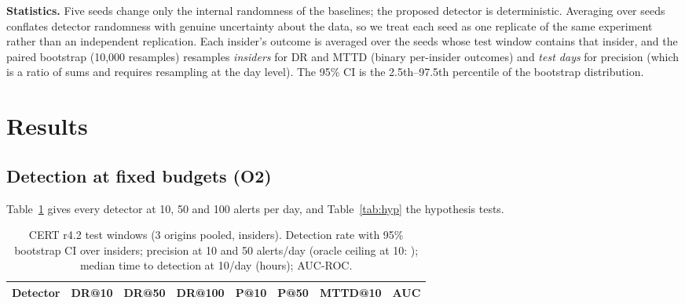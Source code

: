 \documentclass[conference]{IEEEtran}
\begin{document}
\textbf{Statistics.} Five seeds change only the internal randomness of the baselines; the proposed
detector is deterministic. Averaging over seeds conflates detector randomness with genuine
uncertainty about the data, so we treat each seed as one replicate of the same experiment rather
than an independent replication. Each insider's outcome is averaged over the seeds whose test
window contains that insider, and the paired bootstrap (10{,}000 resamples) resamples
\emph{insiders} for DR and MTTD (binary per-insider outcomes) and \emph{test days} for precision
(which is a ratio of sums and requires resampling at the day level). The 95\% CI is the 2.5th--97.5th
percentile of the bootstrap distribution.

\section{Results}
\subsection{Detection at fixed budgets (O2)}
Table~\ref{tab:main} gives every detector at 10, 50 and 100 alerts per day, and Table~\ref{tab:hyp}
the hypothesis tests.

\begin{table}[t]
\centering
\caption{CERT r4.2 test windows (3 origins pooled, \NInsTest{} insiders). Detection rate with 95\%
bootstrap CI over insiders; precision at 10 and 50 alerts/day (oracle ceiling at 10: \OracleP);
median time to detection at 10/day (hours); AUC-ROC.}
\label{tab:main}
\begin{tabular}{lccccccc}
\toprule
Detector & DR@10 & DR@50 & DR@100 & P@10 & P@50 & MTTD@10 & AUC \\
\midrule

\bottomrule
\end{tabular}
\end{table}

\begin{table}[t]
\centering
\caption{Pre-registered hypotheses vs.\ Isolation Forest at 10 alerts/day (supported only if the
whole 95\% interval clears the threshold).}
\label{tab:hyp}
\end{table}
\end{document}
